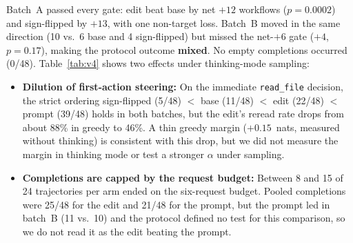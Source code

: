 \documentclass[11pt]{article}
\begin{document}
Batch~A passed every gate: edit beat base by net $+12$ workflows ($p=0.0002$) and sign-flipped by $+13$, with one non-target loss. Batch~B moved in the same direction (10 vs.\ 6 base and 4 sign-flipped) but missed the net-$+6$ gate ($+4$, $p=0.17$), making the protocol outcome \textbf{mixed}. No empty completions occurred (0/48). Table~\ref{tab:v4} shows two effects under thinking-mode sampling:
\begin{itemize}[leftmargin=*,itemsep=1pt,topsep=2pt]
\item \textbf{Dilution of first-action steering:} On the immediate \texttt{read\_file} decision, the strict ordering sign-flipped (5/48) $<$ base (11/48) $<$ edit (22/48) $<$ prompt (39/48) holds in both batches, but the edit's reread rate drops from about 88\% in greedy to 46\%. A thin greedy margin ($+0.15$~nats, measured without thinking) is consistent with this drop, but we did not measure the margin in thinking mode or test a stronger $\alpha$ under sampling.
\item \textbf{Completions are capped by the request budget:} Between 8 and 15 of 24 trajectories per arm ended on the six-request budget. Pooled completions were 25/48 for the edit and 21/48 for the prompt, but the prompt led in batch~B (11 vs.\ 10) and the protocol defined no test for this comparison, so we do not read it as the edit beating the prompt.
\end{itemize}
\end{document}
